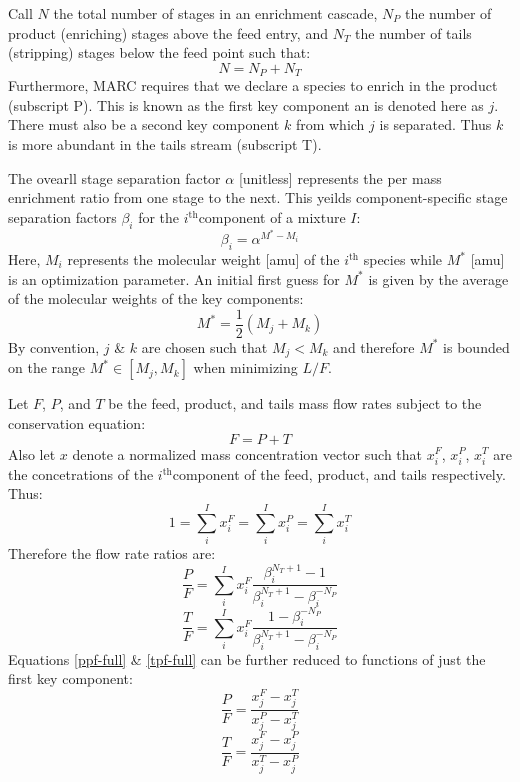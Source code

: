 \documentclass[preprint,12pt]{elsarticle}
\newcommand{\superscript}[1]{\ensuremath{^{\textrm{#1}}}}
\newcommand{\ith}[0]{$i$\superscript{th}}
\begin{document}
Call $N$ the total number of stages in an enrichment cascade, $N_P$ the number of 
product (enriching) stages above the feed entry, and $N_T$ the number of tails
(stripping) stages below the feed point such that:
\begin{equation}
N = N_P + N_T
\end{equation}
Furthermore, MARC requires that we declare a species to enrich in the 
product (subscript P).  This is known as the first key component an is denoted 
here as $j$.  There must also be a second key component $k$ from which $j$ is 
separated. Thus $k$ is more abundant in the tails stream (subscript T).

The ovearll stage separation factor $\alpha$ [unitless] represents the per mass 
enrichment ratio from one stage to the next.  This yeilds component-specific
stage separation factors $\beta_i$ for the \ith component of a mixture $I$:
\begin{equation}
\beta_i = \alpha^{M^* - M_i}
\label{beta_i}
\end{equation}
Here, $M_i$ represents the molecular weight [amu] of the \ith
species while $M^*$ [amu] is an optimization parameter.  An initial first guess for 
$M^*$ is given by the average of the molecular weights of the key components:
\begin{equation}
M^* = \frac{1}{2}\left(M_j + M_k\right)
\label{mstar-guess}
\end{equation}
By convention, $j$ \& $k$ are chosen such that $M_j < M_k$ and 
therefore $M^*$ is bounded on the range $M^*\in[M_j,M_k]$ when minimizing $L/F$.

Let $F$, $P$, and $T$ be the feed, product, and tails mass flow rates subject to 
the conservation equation:
\begin{equation}
F = P + T
\label{total-flow-constraint}
\end{equation}
Also let $x$ denote a normalized mass concentration vector such that $x_i^F$, 
$x_i^P$, $x_i^T$ are the concetrations of the \ith component of the feed, product,
and tails respectively.  Thus:
\begin{equation}
1 = \sum_i^I x_i^F = \sum_i^I x_i^P = \sum_i^I x_i^T 
\end{equation}
Therefore the flow rate ratios are:
\begin{equation}
\frac{P}{F} = \sum_i^I x_i^F\frac{\beta_i^{N_T+1} - 1}
                                 {\beta_i^{N_T+1} - \beta_i^{-N_P}}
\label{ppf-full}
\end{equation}
\begin{equation}
\frac{T}{F} = \sum_i^I x_i^F\frac{1 - \beta_i^{-N_P}}
                                 {\beta_i^{N_T+1} - \beta_i^{-N_P}}
\label{tpf-full}
\end{equation}
Equations \ref{ppf-full} \&  \ref{tpf-full} can be further reduced to functions
of just the first key component:
\begin{equation}
\frac{P}{F} = \frac{x_j^F - x_j^T}{x_j^P - x_j^T}
\label{ppf-key}
\end{equation}
\begin{equation}
\frac{T}{F} = \frac{x_j^F - x_j^P}{x_j^T - x_j^P}
\label{tpf-key}
\end{equation}
\end{document}
